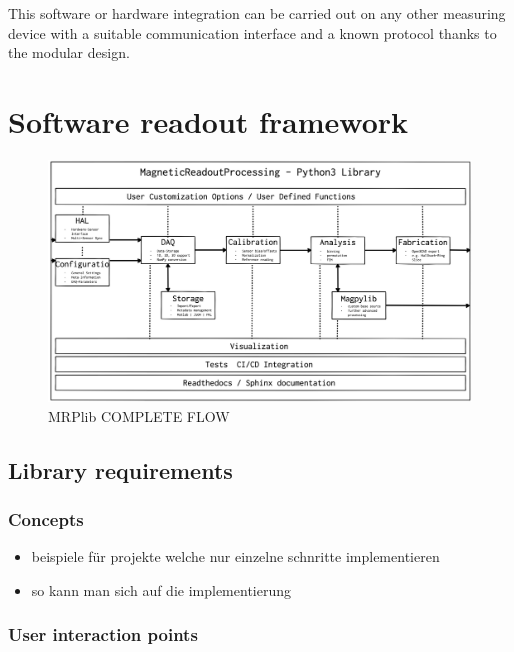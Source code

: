 This software or hardware integration can be carried out on any other
measuring device with a suitable communication interface and a known
protocol thanks to the modular design.

\hypertarget{software-readout-framework}{%
\chapter{Software readout framework}\label{software-readout-framework}}

\begin{figure}
\centering
\includegraphics{./generated_images/border_MRPlib_COMPLETE_FLOW.png}
\caption{MRPlib COMPLETE FLOW \label{MRPlib_COMPLETE_FLOW.png}}
\end{figure}

\hypertarget{library-requirements}{%
\section{Library requirements}\label{library-requirements}}

\hypertarget{concepts}{%
\subsection{Concepts}\label{concepts}}

\begin{itemize}
\tightlist
\item
  beispiele für projekte welche nur einzelne schnritte implementieren
\item
  so kann man sich auf die implementierung
\end{itemize}

\hypertarget{user-interaction-points}{%
\subsection{User interaction points}\label{user-interaction-points}}


